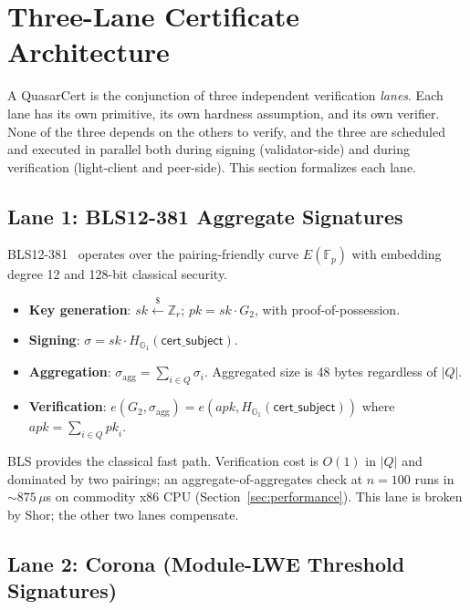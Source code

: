 \section{Three-Lane Certificate Architecture}

\label{sec:crypto}

A QuasarCert is the conjunction of three independent verification
\emph{lanes}. Each lane has its own primitive, its own hardness
assumption, and its own verifier. None of the three depends on the others
to verify, and the three are scheduled and executed in parallel both
during signing (validator-side) and during verification (light-client and
peer-side). This section formalizes each lane.

\subsection{Lane 1: BLS12-381 Aggregate Signatures}

BLS12-381~\cite{boneh2001short} operates over the pairing-friendly curve
$E(\mathbb{F}_p)$ with embedding degree 12 and 128-bit classical security.

\begin{itemize}[leftmargin=2em,nosep]
\item \textbf{Key generation}: $\mathit{sk} \xleftarrow{\$} \mathbb{Z}_r$;
      $\mathit{pk} = \mathit{sk} \cdot G_2$, with proof-of-possession.
\item \textbf{Signing}: $\sigma = \mathit{sk} \cdot
      H_{\mathbb{G}_1}(\mathsf{cert\_subject})$.
\item \textbf{Aggregation}: $\sigma_{\mathrm{agg}} = \sum_{i \in Q}
      \sigma_i$. Aggregated size is 48 bytes regardless of $|Q|$.
\item \textbf{Verification}: $e(G_2, \sigma_{\mathrm{agg}}) =
      e(\mathit{apk}, H_{\mathbb{G}_1}(\mathsf{cert\_subject}))$ where
      $\mathit{apk} = \sum_{i \in Q} \mathit{pk}_i$.
\end{itemize}

BLS provides the classical fast path. Verification cost is $O(1)$ in $|Q|$
and dominated by two pairings; an aggregate-of-aggregates check at
$n{=}100$ runs in ${\sim}875\,\mu$s on commodity x86 CPU
(Section~\ref{sec:performance}). This lane is broken by Shor; the other
two lanes compensate.

\subsection{Lane 2: Corona (Module-LWE Threshold Signatures)}


